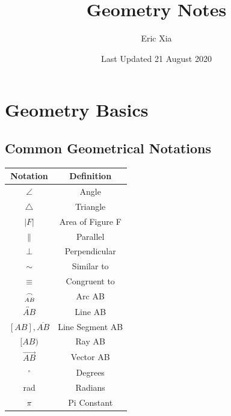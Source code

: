 \documentclass{article}
\title{Geometry Notes}
\author{Eric Xia}
\date{Last Updated 21 August 2020}
\begin{document}
    \maketitle
    \tableofcontents
    \pagebreak

    \section{Geometry Basics}

        \subsection{Common Geometrical Notations}
            \begin{center}
                \begin{tabular}{|c|c|}
                    \hline
                    \textbf{Notation} & \textbf{Definition} \\
                    \hline
                    $\angle$ & Angle \\
                    \hline
                    $\triangle$ & Triangle \\
                    \hline
                    $|F|$ & Area of Figure F \\
                    \hline
                    $\parallel$ & Parallel \\
                    \hline
                    $\perp$ & Perpendicular \\
                    \hline
                    $\sim$ & Similar to \\
                    \hline
                    $\equiv$ & Congruent to \\
                    \hline
                    $\frown \atop AB$ & Arc AB \\
                    \hline
                    $\overleftrightarrow{AB}$ & Line AB \\
                    \hline
                    $[AB],\overline{AB}$ & Line Segment AB \\
                    \hline
                    $[AB)$ & Ray AB \\
                    \hline
                    $\overrightarrow{AB}$ & Vector AB \\
                    \hline
                    $^{\circ}$ & Degrees \\
                    \hline
                    rad & Radians \\
                    \hline
                    $\pi$ & Pi Constant \\
                    \hline
                \end{tabular}
            \end{center}
\end{document}
